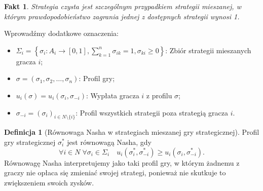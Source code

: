 \documentclass[inzynierska]{pwr_wmat_praca_dyplomowa}
\theoremstyle{plain}
\numberwithin{theorem}{chapter}
\newtheorem{fact}[theorem]{Fakt}
\theoremstyle{definition}
\numberwithin{theorem}{chapter}
\newtheorem{definition}[theorem]{Definicja}
\begin{document}
	\begin{fact}
		Strategia czysta jest szczególnym przypadkiem strategii mieszanej, w którym prawdopodobieństwo zagrania jednej z dostępnych strategii wynosi 1.
	\end{fact}
	Wprowadźmy dodatkowe oznaczenia:
 	\begin{itemize}
 		\item $\Sigma_i  = \left\{ \sigma_i: A_i \rightarrow [0, 1], \sum_{k=1}^{n} \sigma_{ik} = 1,  \sigma_{ki}\ge 0 \right\}$: Zbiór strategii mieszanych gracza $i$;
 		\item  $\sigma = (\sigma_1, \sigma_2, \dots, \sigma_n)$: Profil gry;
 		\item $u_i(\sigma) = u_i(\sigma_i, \sigma_{-i})$: Wypłata gracza $i$ z profilu $\sigma$;
 		\item $\sigma_{-i} = (\sigma_i)_{i\in N \setminus \{i\}}$: Profil wszystkich strategii poza strategią gracza $i$. 
 	\end{itemize}
	\begin{definition}[Równowaga Nasha w strategiach mieszanej gry strategicznej]
		Profil gry strategicznej $\sigma_i^*$ jest równowagą Nasha, gdy
		\begin{equation*}
			\mathop{\forall}{i \in N}\;
			\mathop{\forall}{\sigma_i \in \Sigma_i} \quad
			u_i(\sigma_i^*, \sigma_{-i}^*) \ge u_i(\sigma_i,  \sigma_{-i}^*).
		\end{equation*}
	Równowagę Nasha interpretujemy jako taki profil gry, w którym żadnemu z graczy nie opłaca się zmieniać swojej strategi, ponieważ nie skutkuje to zwiększeniem swoich zysków.
	\end{definition}
\end{document}
